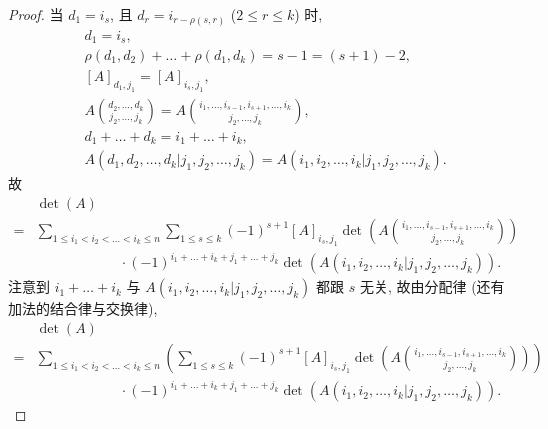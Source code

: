 \documentclass[%
    UTF8,%
    fontset=none,%
    punct=kaiming,%
    zihao=-4,%
    a4paper,%
    oneside,%
]{ctexbook}
\renewcommand*{\leq}{\leqslant}
\begin{document}
\begin{proof}
    当 \(d_1 = i_s\),
    且 \(d_r = i_{r - \rho(s, r)}\)
    (\(2 \leq r \leq k\)) 时,
    \begin{align*}
         &
        d_1 = i_s,
        \\
         &
        \rho(d_1, d_2) + \dots + \rho(d_1, d_k)
        = s - 1 = (s + 1) - 2,
        \\
         &
        [A]_{d_1,j_1} = [A]_{i_s,j_1},
        \\
         &
        A\binom{d_2, \dots, d_k}{j_2, \dots, j_k}
        =
        A\binom{i_1, \dots, i_{s-1}, i_{s+1}, \dots, i_k}
        {j_2, \dots, j_k},
        \\
         &
        d_1 + \dots + d_k = i_1 + \dots + i_k,
        \\
         &
        A({d_1,d_2,\dots,d_k}|{j_1,j_2,\dots,j_k})
        =
        A({i_1,i_2,\dots,i_k}|{j_1,j_2,\dots,j_k}).
    \end{align*}
    故
    \begin{align*}
             &
        \det {(A)}
        \\
        = {} &
        \sum_{1 \leq i_1 < i_2 < \dots < i_k \leq n}
        {\sum_{1 \leq s \leq k}
            {(-1)^{s+1} [A]_{i_s,j_1}
                \det {\left(
                    A\binom{i_1, \dots, i_{s-1},
                        i_{s+1}, \dots, i_k}
                    {j_2, \dots, j_k}
                    \right)}}}
        \\
             &
        \qquad \qquad \qquad
        \cdot
        (-1)^{i_1 + \dots + i_k + j_1 + \dots + j_k}
        \det {(A({i_1,i_2,\dots,i_k}|{j_1,j_2,\dots,j_k}))}.
    \end{align*}
    注意到 \(i_1 + \dots + i_k\) 与
    \(A({i_1,i_2,\dots,i_k}|{j_1,j_2,\dots,j_k})\)
    都跟 \(s\) 无关,
    故由分配律 (还有加法的结合律与交换律),
    \begin{align*}
             &
        \det {(A)}
        \\
        = {} &
        \sum_{1 \leq i_1 < i_2 < \dots < i_k \leq n}
        {\left(
            \sum_{1 \leq s \leq k}
            {(-1)^{s+1} [A]_{i_s,j_1}
                \det {\left(
                    A\binom{i_1, \dots, i_{s-1},
                        i_{s+1}, \dots, i_k}
                    {j_2, \dots, j_k}
                    \right)}}
            \right)}
        \\
             &
        \qquad \qquad \qquad
        \cdot
        (-1)^{i_1 + \dots + i_k + j_1 + \dots + j_k}
        \det {(A({i_1,i_2,\dots,i_k}|{j_1,j_2,\dots,j_k}))}.

\end{align*}
\end{proof}
\end{document}
